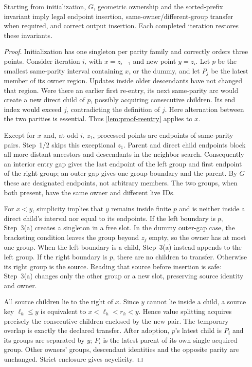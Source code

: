 \begin{lemma}
\label{lem:proof-locality}
Starting from initialization, $G$, geometric ownership and the sorted-prefix
invariant imply legal endpoint insertion, same-owner/different-group transfer
when required, and correct output insertion. Each completed iteration restores
these invariants.
\end{lemma}
\begin{proof}
Initialization has one singleton per parity family and correctly orders three
points. Consider iteration $i$, with $x=z_{i-1}$ and new point $y=z_i$.
Let $p$ be the smallest same-parity interval containing $x$, or the dummy,
and let $P_j$ be the latest member of its owner region. Updates inside older
descendants have not changed that region. Were there an earlier first
re-entry, its next same-parity arc would create a new direct child of $p$,
possibly acquiring consecutive children. Its end index would exceed $j$,
contradicting the definition of $j$. Here alternation between the two
parities is essential. Thus \cref{lem:proof-reentry} applies to $x$.

Except for $x$ and, at odd $i$, $z_1$, processed points are endpoints of
same-parity pairs. Step~1/2 skips this exceptional $z_1$. Parent and direct
child endpoints block all more distant ancestors and descendants in the
neighbor search. Consequently an interior entry gap gives the last endpoint
of the left group and first endpoint of the right group; an outer gap gives
one group boundary and the parent. By $G$ these are designated endpoints,
not arbitrary members. The two groups, when both present, have the same owner
and different live IDs.

For $x<y$, simplicity implies that $y$ remains inside finite $p$ and is
neither inside a direct child's interval nor equal to its endpoints.
If the left boundary is $p$, Step~3(a) creates a singleton in a free slot.
In the dummy outer-gap case, the bracketing condition leaves the group
beyond $z_j$ empty, so the owner has at most one group. When the left
boundary is a child, Step~3(a) instead appends to the left group. If the right boundary is $p$,
there are no children to transfer. Otherwise its right group is the source.
Reading that source before insertion is safe: Step~3(a) changes only the
other group or a new slot, preserving source identity and owner.

All source children lie to the right of $x$. Since $y$ cannot lie inside a
child, a source key $\ell_h\leq y$ is equivalent to
$x<\ell_h<r_h<y$. Hence value splitting acquires precisely the consecutive
children enclosed by the new pair. The temporary overlap is exactly the
declared transfer. After adoption, $p$'s latest child is $P_i$ and its groups
are separated by $y$; $P_i$ is the latest parent of its own single acquired
group. Other owners' groups, descendant identities and the opposite parity
are unchanged. Strict enclosure gives acyclicity.


\end{proof}
